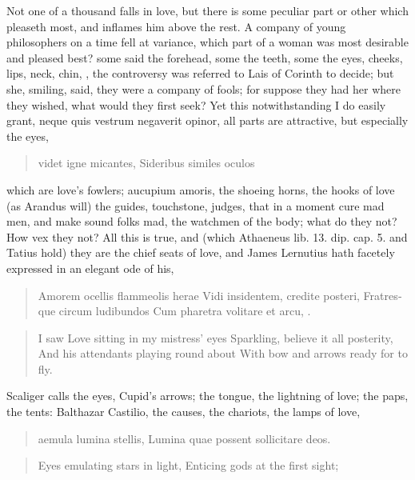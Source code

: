 Not one of a thousand falls in love, but there is some peculiar part or
other which pleaseth most, and inflames him above the rest. A
company of young philosophers on a time fell at variance, which part of
a woman was most desirable and pleased best? some said the forehead,
some the teeth, some the eyes, cheeks, lips, neck, chin, \etc{}, the
controversy was referred to Lais of Corinth to decide; but she,
smiling, said, they were a company of fools; for suppose they had her
where they wished, what would they first seek? Yet this
notwithstanding I do easily grant, neque quis vestrum negaverit opinor,
all parts are attractive, but especially the eyes, 

\begin{latin}
\begin{verse}%
videt igne micantes,
Sideribus similes oculos
\end{verse}%
\end{latin}

which are love's fowlers; aucupium amoris, the shoeing horns, the
hooks of love (as Arandus will) the guides, touchstone, judges, that in
a moment cure mad men, and make sound folks mad, the watchmen of the
body; what do they not? How vex they not? All this is true, and (which
Athaeneus lib. 13. dip. cap. 5. and Tatius hold) they are the chief
seats of love, and James Lernutius hath facetely expressed in an
elegant ode of his,

\begin{latin}
\begin{verse}%
Amorem ocellis flammeolis herae
Vidi insidentem, credite posteri,
Fratresque circum ludibundos
Cum pharetra volitare et arcu, \etc{}.
\end{verse}%
\end{latin}
\translationrule%
\begin{verse}%
I saw Love sitting in my mistress' eyes
Sparkling, believe it all posterity,
And his attendants playing round about
With bow and arrows ready for to fly.
\end{verse}%

Scaliger calls the eyes, Cupid's arrows; the tongue, the
lightning of love; the paps, the tents: Balthazar Castilio, the
causes, the chariots, the lamps of love,

\begin{latin}
\begin{verse}%
aemula lumina stellis,
Lumina quae possent sollicitare deos.
\end{verse}%
\end{latin}
\translationrule%
\begin{verse}%
Eyes emulating stars in light,
Enticing gods at the first sight;
\end{verse}%

